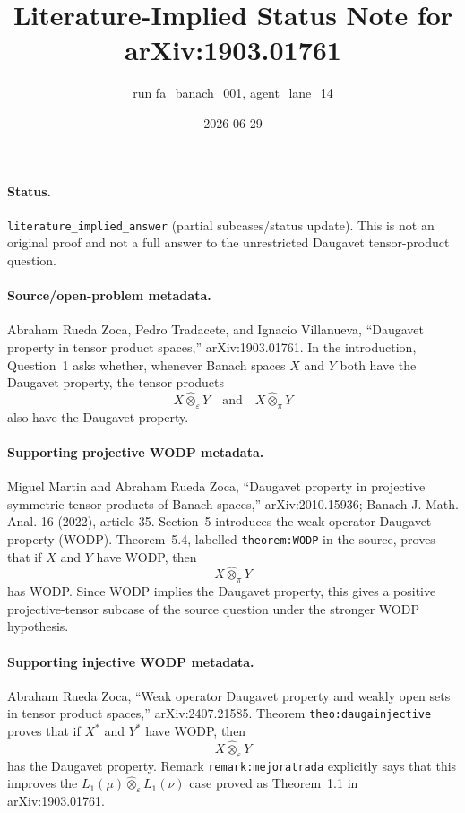 \documentclass[11pt]{article}
\title{Literature-Implied Status Note for arXiv:1903.01761}
\author{run fa\_banach\_001, agent\_lane\_14}
\date{2026-06-29}
\begin{document}
\maketitle

\paragraph{Status.}
\texttt{literature\_implied\_answer} (partial subcases/status update). This is
not an original proof and not a full answer to the unrestricted Daugavet
tensor-product question.

\paragraph{Source/open-problem metadata.}
Abraham Rueda Zoca, Pedro Tradacete, and Ignacio Villanueva, ``Daugavet
property in tensor product spaces,'' arXiv:1903.01761. In the introduction,
Question~1 asks whether, whenever Banach spaces \(X\) and \(Y\) both have the
Daugavet property, the tensor products
\[
  X\widehat{\otimes}_{\varepsilon}Y
  \quad\text{and}\quad
  X\widehat{\otimes}_{\pi}Y
\]
also have the Daugavet property.

\paragraph{Supporting projective WODP metadata.}
Miguel Martin and Abraham Rueda Zoca, ``Daugavet property in projective
symmetric tensor products of Banach spaces,'' arXiv:2010.15936; Banach
J. Math. Anal. 16 (2022), article 35. Section~5 introduces the weak operator
Daugavet property (WODP). Theorem~5.4, labelled \texttt{theorem:WODP} in the
source, proves that if \(X\) and \(Y\) have WODP, then
\[
  X\widehat{\otimes}_{\pi}Y
\]
has WODP. Since WODP implies the Daugavet property, this gives a positive
projective-tensor subcase of the source question under the stronger WODP
hypothesis.

\paragraph{Supporting injective WODP metadata.}
Abraham Rueda Zoca, ``Weak operator Daugavet property and weakly open sets in
tensor product spaces,'' arXiv:2407.21585. Theorem \texttt{theo:daugainjective}
proves that if \(X^*\) and \(Y^*\) have WODP, then
\[
  X\widehat{\otimes}_{\varepsilon}Y
\]
has the Daugavet property. Remark \texttt{remark:mejoratrada} explicitly says
that this improves the \(L_1(\mu)\widehat{\otimes}_{\varepsilon}L_1(\nu)\)
case proved as Theorem~1.1 in arXiv:1903.01761.
\end{document}
